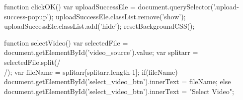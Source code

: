        function clickOK() {
            var uploadSuccessEle = document.querySelector('.upload-success-popup');
            uploadSuccessEle.classList.remove('show');
            uploadSuccessEle.classList.add('hide');
            resetBackgroundCSS();
        }

        function selectVideo() {
            var selectedFile = document.getElementById('video_source').value;
            var splitarr = selectedFile.split(/\\/);
            var fileName = splitarr[splitarr.length-1];
            if(fileName) {
                document.getElementById('select_video_btn').innerText = fileName;
            } else {
                document.getElementById('select_video_btn').innerText = "Select Video";
            }
        }
